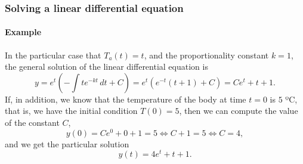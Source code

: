 \begin{frame}
\frametitle{Solving a linear differential equation}
\framesubtitle{Example}
In the particular case that $T_a(t)=t$, and the proportionality constant $k=1$, the general solution of the linear differential equation is
\[
y=e^{t}\left(-\int te^{-kt}\,dt+C\right)=e^t(e^{-t}(t+1)+C)=Ce^t+t+1.
\]
If, in addition, we know that the temperature of the body at time $t=0$ is $5$ ºC, that is, we have the initial condition $T(0)=5$, then we can compute the value of the constant $C$,
\[
y(0)=Ce^0+0+1=5 \Leftrightarrow C+1=5 \Leftrightarrow C=4,
\]
and we get the particular solution
\[
y(t)=4e^t+t+1.
\]
\end{frame}
